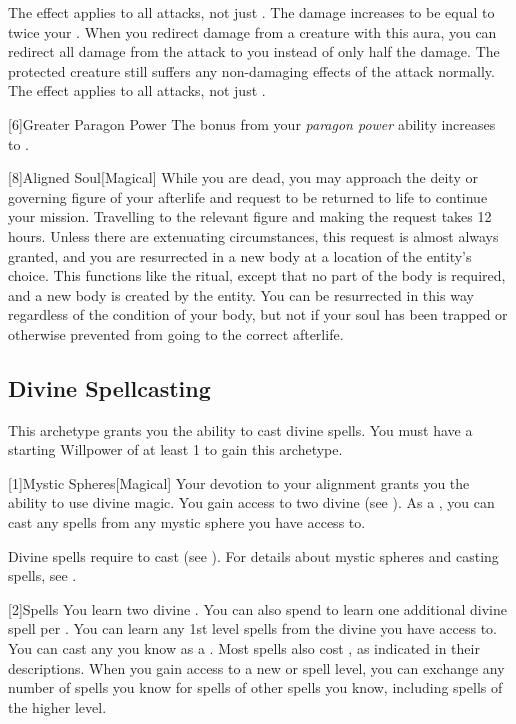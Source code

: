          The effect applies to all attacks, not just .
         The damage increases to be equal to twice your .
         When you redirect damage from a creature with this aura, you can redirect all damage from the attack to you instead of only half the damage.
        The protected creature still suffers any non-damaging effects of the attack normally.
         The effect applies to all attacks, not just .

        [6]{Greater Paragon Power} The bonus from your \textit{paragon power} ability increases to .

        [8]{Aligned Soul}[Magical]
        While you are dead, you may approach the deity or governing figure of your afterlife and request to be returned to life to continue your mission.
        Travelling to the relevant figure and making the request takes 12 hours.
        Unless there are extenuating circumstances, this request is almost always granted, and you are resurrected in a new body at a location of the entity's choice.
        This functions like the  ritual, except that no part of the body is required, and a new body is created by the entity.
        You can be resurrected in this way regardless of the condition of your body, but not if your soul has been trapped or otherwise prevented from going to the correct afterlife.

    \subsection{Divine Spellcasting}
        This archetype grants you the ability to cast divine spells.
        You must have a starting Willpower of at least 1 to gain this archetype.

        [1]{Mystic Spheres}[Magical]
        Your devotion to your alignment grants you the ability to use divine magic.
        You gain access to two divine  (see ).
        As a , you can cast any  spells from any mystic sphere you have access to.

        Divine spells require  to cast (see ).
        For details about mystic spheres and casting spells, see .

        [2]{Spells} You learn two divine .
        You can also spend  to learn one additional divine spell per .
        You can learn any 1st level spells from the divine  you have access to.
        You can cast any  you know as a .
        Most spells also cost , as indicated in their descriptions.
        When you gain access to a new  or spell level, you can exchange any number of spells you know for spells of other spells you know, including spells of the higher level.

